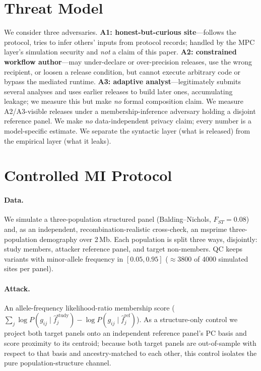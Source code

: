 \documentclass[11pt]{article}
\begin{document}
\section{Threat Model}
We consider three adversaries. \textbf{A1: honest-but-curious site}---follows
the protocol, tries to infer others' inputs from protocol records; handled by
the MPC layer's simulation security and \emph{not} a claim of this paper.
\textbf{A2: constrained workflow author}---may under-declare or over-precision
releases, use the wrong recipient, or loosen a release condition, but cannot
execute arbitrary code or bypass the mediated runtime. \textbf{A3: adaptive
analyst}---legitimately submits several analyses and uses earlier releases to
build later ones, accumulating leakage; we measure this but make \emph{no}
formal composition claim. We measure A2/A3-visible releases under a
membership-inference adversary holding a disjoint reference panel. We make
\emph{no} data-independent privacy claim; every number is a model-specific
estimate. We separate the syntactic layer (what is released) from the empirical
layer (what it leaks).

\section{Controlled MI Protocol}
\label{sec:controlled}
\paragraph{Data.} We simulate a three-population structured panel
(Balding--Nichols, $F_{ST}=0.08$) and, as an independent,
recombination-realistic cross-check, an msprime three-population demography over
2\,Mb. Each population is split three ways, disjointly: study members, attacker
reference panel, and target non-members. QC keeps variants with minor-allele
frequency in $[0.05,0.95]$ ($\approx 3800$ of $4000$ simulated sites per panel).

\paragraph{Attack.} An allele-frequency likelihood-ratio membership score
($\sum_j \log P(g_{ij}\mid \hat f^{\text{study}}_j) - \log P(g_{ij}\mid
\hat f^{\text{ref}}_j)$). As a structure-only control we project both target
panels onto an independent reference panel's PC basis and score proximity to its
centroid; because both target panels are out-of-sample with respect to that
basis and ancestry-matched to each other, this control isolates the pure
population-structure channel.
\end{document}
